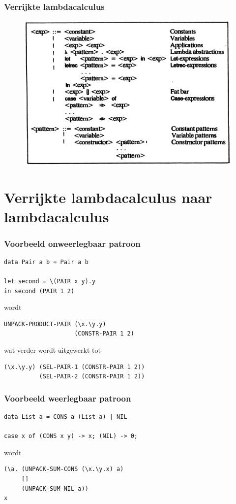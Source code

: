 \documentclass{beamer}
\begin{document}
\begin{frame}
  \frametitle{Verrijkte lambdacalculus}
  \begin{figure}
    \includegraphics[width=\linewidth]{images/ELC_syntax}
  \end{figure}
\end{frame}

\section{Verrijkte lambdacalculus naar lambdacalculus}
\begin{frame}[fragile]
  \frametitle{Voorbeeld onweerlegbaar patroon}
  \begin{lstlisting}
data Pair a b = Pair a b

let second = \(PAIR x y).y
in second (PAIR 1 2)
  \end{lstlisting}
wordt
  \begin{lstlisting}
UNPACK-PRODUCT-PAIR (\x.\y.y)
                    (CONSTR-PAIR 1 2)
  \end{lstlisting}
wat verder wordt uitgewerkt tot
  \begin{lstlisting}
(\x.\y.y) (SEL-PAIR-1 (CONSTR-PAIR 1 2))
          (SEL-PAIR-2 (CONSTR-PAIR 1 2))
  \end{lstlisting}
\end{frame}

\begin{frame}[fragile]
  \frametitle{Voorbeeld weerlegbaar patroon}
  \begin{lstlisting}
data List a = CONS a (List a) | NIL

case x of (CONS x y) -> x; (NIL) -> 0;
  \end{lstlisting}
wordt
  \begin{lstlisting}
(\a. (UNPACK-SUM-CONS (\x.\y.x) a)
     []
     (UNPACK-SUM-NIL a))
x
  \end{lstlisting}
\end{frame}
\end{document}
